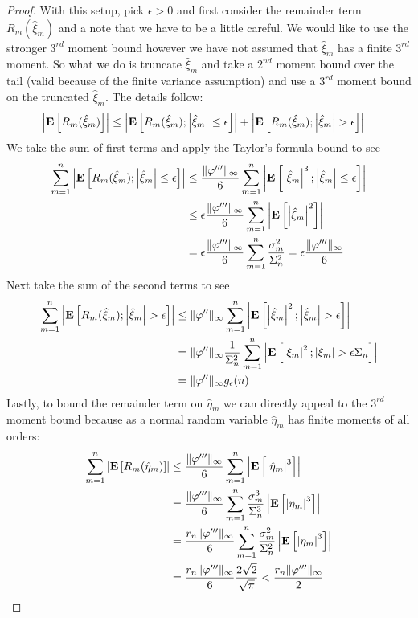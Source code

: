 \documentclass{amsart}
\theoremstyle{remark}
\theoremstyle{definition}
\begin{document}
\begin{proof}
With this setup, pick $\epsilon >0$ and first consider the remainder term $R_m(\hat{\xi}_m) $
and a note that we have to be a little careful.  We would like to use
the stronger $3^{rd}$ moment bound however we have not
assumed that $\hat{\xi}_m$ has a finite $3^{rd}$ moment.  So what we
do is truncate $\hat{\xi}_m$ and take a $2^{nd}$ moment bound over the
tail (valid because of the finite variance assumption) and use a
$3^{rd}$ moment bound on the truncated $\hat{\xi}_m$.  The details follow:
\begin{align*}
\left \vert \textbf{E}\left[R_m(\hat{\xi}_m) \right] \right \vert &\leq
\left \vert \textbf{E}\left[R_m(\hat{\xi}_m) ; \left \vert \hat{\xi}_m \right \vert \leq \epsilon\right] \right \vert
+ \left \vert \textbf{E}\left[R_m(\hat{\xi}_m) ; \left \vert \hat{\xi}_m \right \vert > \epsilon\right] \right \vert
\end{align*}
We take the sum of first terms and apply the Taylor's formula bound to see 
\begin{align*}
\sum_{m=1}^n \left \vert \textbf{E}\left[R_m(\hat{\xi}_m) ; \left \vert \hat{\xi}_m \right \vert \leq
    \epsilon\right] \right \vert
&\leq
\frac{\lVert \varphi^{\prime\prime\prime} \rVert_\infty}{6} \sum_{m=1}^n \left \vert \textbf{E}\left[\left \vert \hat{\xi}_m \right \vert^3
    ; \left \vert \hat{\xi}_m \right \vert \leq \epsilon\right] \right \vert \\
&\leq
\epsilon \frac{\lVert \varphi^{\prime\prime\prime} \rVert_\infty}{6} \sum_{m=1}^n
\left \vert \textbf{E}\left[\left \vert \hat{\xi}_m \right \vert^2\right] \right \vert \\
&=
\epsilon \frac{\lVert \varphi^{\prime\prime\prime} \rVert_\infty}{6} \sum_{m=1}^n
\frac{\sigma_m^2}{\Sigma_n^2} = \epsilon \frac{\lVert \varphi^{\prime\prime\prime} \rVert_\infty}{6} \\
\end{align*}
Next take the sum of the second terms to see
\begin{align*}
\sum_{m=1}^n \left \vert \textbf{E}\left[R_m(\hat{\xi}_m) ; \left \vert \hat{\xi}_m \right \vert >
    \epsilon\right] \right \vert
&\leq
\lVert \varphi^{\prime\prime} \rVert_\infty\sum_{m=1}^n \left \vert \textbf{E}\left[\left \vert \hat{\xi}_m \right \vert^2
    ; \left \vert \hat{\xi}_m \right \vert > \epsilon\right] \right \vert \\
&=
\lVert \varphi^{\prime\prime} \rVert_\infty \frac{1}{\Sigma_n^2}\sum_{m=1}^n \left \vert \textbf{E}\left[\left \vert \xi_m \right \vert^2
    ; \left \vert \xi_m \right \vert > \epsilon \Sigma_n\right] \right \vert \\
&= \lVert \varphi^{\prime\prime} \rVert_\infty g_\epsilon(n)
\end{align*}
Lastly, to bound the remainder term on $\hat{\eta}_m$ we can directly
appeal to the $3^{rd}$ moment bound because as a normal random
variable $\hat{\eta}_m$ has finite moments of all orders:
\begin{align*}
\sum_{m=1}^n \left \vert \textbf{E}\left[R_m(\hat{\eta}_m) \right] \right \vert
&\leq
\frac{\lVert \varphi^{\prime\prime\prime} \rVert_\infty}{6} \sum_{m=1}^n
\left \vert \textbf{E}\left[\left \vert \hat{\eta}_m \right \vert^3\right] \right \vert \\
&= \frac{\lVert \varphi^{\prime\prime\prime} \rVert_\infty}{6} \sum_{m=1}^n \frac{\sigma_m^3}{\Sigma_n^3}
\left \vert \textbf{E}\left[\left \vert \eta_m \right \vert^3\right] \right \vert \\
&= \frac{r_n \lVert \varphi^{\prime\prime\prime} \rVert_\infty}{6} \sum_{m=1}^n \frac{\sigma_m^2}{\Sigma_n^2}
\left \vert \textbf{E}\left[\left \vert \eta_m \right \vert^3\right] \right \vert \\
&= \frac{r_n \lVert \varphi^{\prime\prime\prime} \rVert_\infty}{6}
\frac{2\sqrt{2}}{\sqrt{\pi}} < \frac{r_n \lVert \varphi^{\prime\prime\prime} \rVert_\infty}{2}
\end{align*}


\end{proof}
\end{document}
